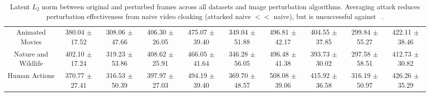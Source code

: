 \begin{table}[t]
{\begin{tabular}{cccccccccc}
\multicolumn{1}{c|}{Animated Movies}     & 380.04 $\pm$ 17.52 & 308.06 $\pm$ 47.66                                       & \multicolumn{1}{c|}{406.30 $\pm$ 26.05}                                                 & 475.07 $\pm$ 39.40 & 349.04 $\pm$ 51.88                                       & \multicolumn{1}{c|}{496.81 $\pm$ 42.17}                                                 & 404.55 $\pm$ 37.85 & 299.84 $\pm$ 55.27                                       & 422.11 $\pm$ 38.46                                                 \\
\multicolumn{1}{c|}{Nature and Wildlife} & 402.10 $\pm$ 17.24 & 319.23 $\pm$ 53.86                                       & \multicolumn{1}{c|}{408.62 $\pm$ 25.91}                                                 & 466.05 $\pm$ 41.64 & 346.28 $\pm$ 56.05                                       & \multicolumn{1}{c|}{496.48 $\pm$ 41.38}                                                 & 393.73 $\pm$ 30.02 & 297.58 $\pm$ 58.51                                       & 412.73 $\pm$ 30.82                                                 \\
\multicolumn{1}{c|}{Human Actions}       & 370.77 $\pm$ 27.41 & 316.53 $\pm$ 50.39                                       & \multicolumn{1}{c|}{397.97 $\pm$ 27.03}                                                 & 494.19 $\pm$ 39.40 & 369.70 $\pm$ 48.57                                       & \multicolumn{1}{c|}{508.08 $\pm$ 39.06}                                                 & 415.92 $\pm$ 36.58 & 316.19 $\pm$ 50.97                                       & 426.26 $\pm$ 35.29                                                
\end{tabular}
    }
    \caption{Latent $L_2$ norm between original and perturbed frames across all datasets and image perturbation algorithms. Averaging attack reduces perturbation effectiveness from naive video cloaking (attacked naive $<<$ naive), but is unsuccessful against \system~.}
    \label{tab:adv-algorithm-robustness-loss}
\end{table}

